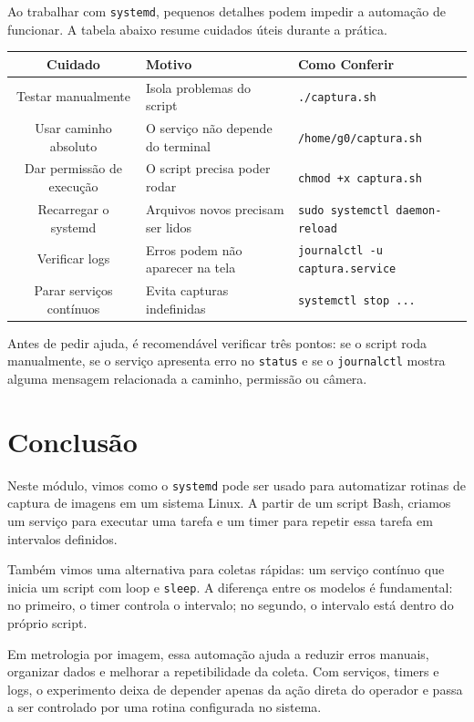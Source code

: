 \documentclass[12pt]{article}
\begin{document}
Ao trabalhar com \texttt{systemd}, pequenos detalhes podem impedir a automação de funcionar. A tabela abaixo resume cuidados úteis durante a prática.

\begin{cmdbox}
\begin{tabularx}{\linewidth}{@{}C >{\raggedright\arraybackslash}X >{\raggedright\arraybackslash}X@{}}
\toprule
\textbf{Cuidado} & \textbf{Motivo} & \textbf{Como Conferir} \\
\midrule
Testar manualmente & Isola problemas do script & \texttt{./captura.sh} \\
Usar caminho absoluto & O serviço não depende do terminal & \texttt{/home/g0/captura.sh} \\
Dar permissão de execução & O script precisa poder rodar & \texttt{chmod +x captura.sh} \\
Recarregar o systemd & Arquivos novos precisam ser lidos & \texttt{sudo systemctl daemon-reload} \\
Verificar logs & Erros podem não aparecer na tela & \texttt{journalctl -u captura.service} \\
Parar serviços contínuos & Evita capturas indefinidas & \texttt{systemctl stop ...} \\
\bottomrule
\end{tabularx}
\end{cmdbox}

Antes de pedir ajuda, é recomendável verificar três pontos: se o script roda manualmente, se o serviço apresenta erro no \texttt{status} e se o \texttt{journalctl} mostra alguma mensagem relacionada a caminho, permissão ou câmera.

\section{Conclusão}

Neste módulo, vimos como o \texttt{systemd} pode ser usado para automatizar rotinas de captura de imagens em um sistema Linux. A partir de um script Bash, criamos um serviço para executar uma tarefa e um timer para repetir essa tarefa em intervalos definidos.

Também vimos uma alternativa para coletas rápidas: um serviço contínuo que inicia um script com loop e \texttt{sleep}. A diferença entre os modelos é fundamental: no primeiro, o timer controla o intervalo; no segundo, o intervalo está dentro do próprio script.

Em metrologia por imagem, essa automação ajuda a reduzir erros manuais, organizar dados e melhorar a repetibilidade da coleta. Com serviços, timers e logs, o experimento deixa de depender apenas da ação direta do operador e passa a ser controlado por uma rotina configurada no sistema.
\end{document}

